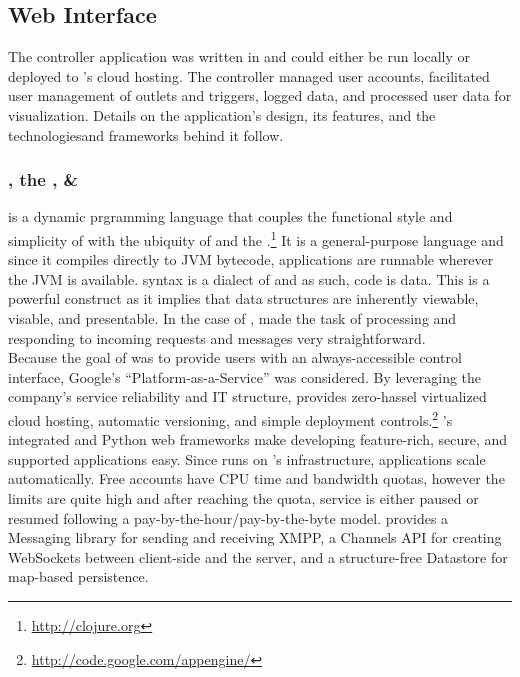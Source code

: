 \subsection{\clojure Web Interface}
The \netlets controller application was written in \clojure and could either be run locally or deployed to \google's cloud hosting.  The controller managed user accounts, facilitated user management of \netlet outlets and triggers, logged \netlet data, and processed user data for visualization.  Details on the application's design, its features, and the technologiesand frameworks behind it follow.

\subsubsection{\clojure, the \jvm, \& \gae}
\clojure is a dynamic prgramming language that couples the functional style and simplicity of \lisp with the ubiquity of \java and the \jvm.\footnote{\url{http://clojure.org}} It is a general-purpose language and since it compiles directly to JVM bytecode, \clojure applications are runnable wherever the JVM is available.  \clojure syntax is a dialect of \lisp and as such, \clojure code is \clojure data.  This is a powerful construct as it implies that \clojure data structures are inherently viewable, visable, and presentable.  In the case of \netlets, \clojure made the task of processing and responding to incoming requests and messages very straightforward.\\

Because the goal of \netlets was to provide users with an always-accessible control interface, Google's \aengn ``Platform-as-a-Service''  was considered.  By leveraging the company's service reliability and IT structure, \gae provides zero-hassel virtualized cloud hosting, automatic versioning, and simple deployment controls.\footnote{\url{http://code.google.com/appengine/}}  \google's integrated \java and Python web frameworks make developing feature-rich, secure, and supported applications easy. Since \gae runs on \google's infrastructure, applications scale automatically.  Free \gae accounts have CPU time and bandwidth quotas, however the limits are quite high and after reaching the quota, service is either paused or resumed following a pay-by-the-hour/pay-by-the-byte model.  \aengn provides a Messaging library for sending and receiving XMPP, a Channels API for creating WebSockets between client-side \js  and the server, and a structure-free Datastore for map-based persistence.\\

